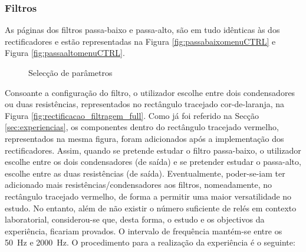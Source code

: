 \subsubsection{Filtros}
\label{sec:filtrosSW}
As páginas dos filtros passa-baixo e passa-alto, são em tudo idênticas às dos rectificadores e estão representadas na Figura \ref{fig:passabaixomenuCTRL} e Figura \ref{fig:passaaltomenuCTRL}.

\begin{figure}[hbtp]
	\centering%
		\centering
		\qquad
		\caption{Selecção de parâmetros}%
		\label{fig:controlofiltros}%
\end{figure}

Consoante a configuração do filtro, o utilizador escolhe entre dois condensadores ou duas resistências, representados no rectângulo tracejado cor-de-laranja, na Figura \ref{fig:rectificacao_filtragem_full}. Como já foi referido na Secção \ref{sec:experiencias}, os componentes dentro do rectângulo tracejado vermelho, representados na mesma figura, foram adicionados após a implementação dos rectificadores. Assim, quando se pretende estudar o filtro passa-baixo, o utilizador escolhe entre os dois condensadores (de saída) e se pretender estudar o passa-alto, escolhe entre as duas resistências (de saída). Eventualmente, poder-se-iam ter adicionado mais resistências/condensadores aos filtros, nomeadamente, no rectângulo tracejado vermelho, de forma a permitir uma maior versatilidade no estudo. No entanto, além de não existir o número suficiente de relés em contexto laboratorial, considerou-se que, desta forma, o estudo e os objectivos da experiência, ficariam provados. O intervalo de frequência mantém-se entre os \SI{50}{\hertz} e \SI{2000}{\hertz}. O procedimento para a realização da experiência é o seguinte:

